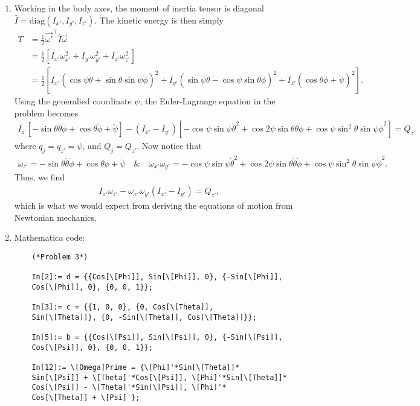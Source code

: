 \documentclass{article}
\theoremstyle{definition}
\newcommand{\f}[2]{\frac{#1}{#2}}
\newcommand{\lb}{\left[}
\newcommand{\rb}{\right]}
\begin{document}
\begin{enumerate}[label=(\alph*)]
	\item Working in the body axes, the moment of inertia tensor is diagonal $\hat I  = \text{diag}(I_{x'}, I_{y'} , I_{z'})$. The kinetic energy is then simply 
	\begin{align*}
	T &= \f{1}{2} \vec{\omega'}^\top \hat{I} \vec{\omega}\\
	&= \f{1}{2} \lb I_{x'} \omega_{x'}^2 + I_{y'}\omega_{y'}^2 + I_{z'}\omega_{z'}^2  \rb\\
	&= \f{1}{2}\lb I_{x'}(\cos\psi \dot\theta + \sin\theta \sin\psi \dot\phi)^2  + 
	I_{y'} (\sin\psi \dot\theta - \cos\psi \sin\theta \dot\phi)^2 + 
	I_{z'}(\cos\theta \dot\phi + \dot\psi)^2\rb.
	\end{align*}
	Using the generalied coordinate $\psi$, the Euler-Lagrange equation in the problem becomes 
	\begin{align*}
	I_{z'} \lb -\sin\theta \dot\theta \dot\phi+ \cos\theta \ddot\phi + \ddot\psi  \rb - (I_{x'} - I_{y'})
	\lb -\cos\psi \sin\psi \dot\theta^2+\cos 2\psi \sin\theta \dot\theta \dot \phi +\cos\psi \sin^2\theta\sin\psi \dot \phi^2 \rb 
	= Q_{z'}
	\end{align*}
	where $q_j = q_{z'} = \psi$, and $Q_j = Q_{z'}$. Now notice that 
	\begin{align*}
	\dot\omega_{z'} = -\sin\theta \dot\theta \dot\phi+ \cos\theta \ddot\phi + \ddot\psi\quad 
	\text{\&} 
	\quad
	\omega_{x'} \omega_{y'} = -\cos\psi \sin\psi \dot\theta^2+\cos 2\psi \sin\theta \dot\theta \dot \phi +\cos\psi \sin^2\theta\sin\psi \dot \phi^2.
	\end{align*}
	Thus, we find 
	\begin{align*}
	I_{z'} \omega_{z'} - \omega_{x'} \omega_{y'} (I_{x'} - I_{y'}) = Q_{z'},
	\end{align*}
	which is what we would expect from deriving the equations of motion from Newtonian mechanics. 
	
	
	\item Mathematica code:
	\begin{lstlisting}
	(*Problem 3*)
	
	In[2]:= d = {{Cos[\[Phi]], Sin[\[Phi]], 0}, {-Sin[\[Phi]], 
	Cos[\[Phi]], 0}, {0, 0, 1}};
	
	In[3]:= c = {{1, 0, 0}, {0, Cos[\[Theta]], 
	Sin[\[Theta]]}, {0, -Sin[\[Theta]], Cos[\[Theta]]}};
	
	In[5]:= b = {{Cos[\[Psi]], Sin[\[Psi]], 0}, {-Sin[\[Psi]], 
	Cos[\[Psi]], 0}, {0, 0, 1}};
	
	In[12]:= \[Omega]Prime = {\[Phi]'*Sin[\[Theta]]*
	Sin[\[Psi]] + \[Theta]'*Cos[\[Psi]], \[Phi]'*Sin[\[Theta]]*
	Cos[\[Psi]] - \[Theta]'*Sin[\[Psi]], \[Phi]'*
	Cos[\[Theta]] + \[Psi]'};
	

\end{lstlisting}
\end{enumerate}
\end{document}
